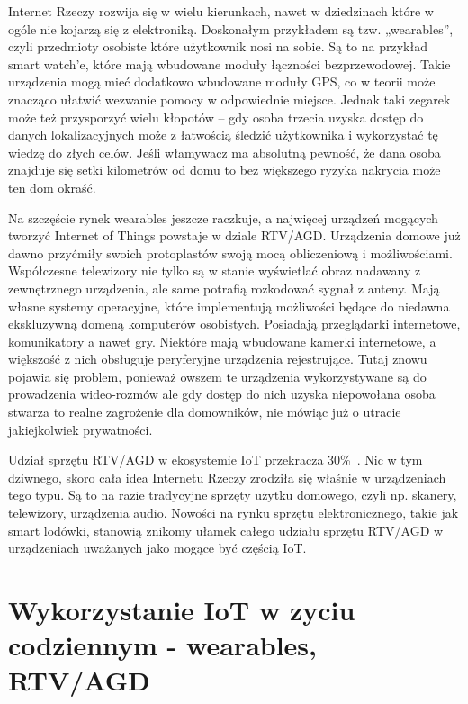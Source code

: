 \documentclass[brudnopis]{xmgr}
\begin{document}
Internet Rzeczy rozwija się w wielu kierunkach, nawet w dziedzinach które w ogóle nie kojarzą się z elektroniką. Doskonałym przykładem są tzw. „wearables”, czyli przedmioty osobiste które użytkownik nosi na sobie. Są to na przykład smart watch'e, które mają wbudowane moduły łączności bezprzewodowej.  Takie urządzenia mogą mieć dodatkowo wbudowane moduły GPS, co w teorii może znacząco ułatwić wezwanie pomocy w odpowiednie miejsce. Jednak taki zegarek może też przysporzyć wielu kłopotów – gdy osoba trzecia uzyska dostęp do danych lokalizacyjnych  może z łatwością śledzić użytkownika i wykorzystać tę wiedzę do złych celów. Jeśli włamywacz ma absolutną pewność, że dana osoba znajduje się setki kilometrów od domu to bez większego ryzyka nakrycia może ten dom okraść.

Na szczęście rynek wearables jeszcze raczkuje, a najwięcej urządzeń mogących tworzyć Internet of Things powstaje w dziale RTV/AGD. Urządzenia domowe już dawno przyćmiły swoich protoplastów swoją mocą obliczeniową i możliwościami. Współczesne telewizory nie tylko są w stanie wyświetlać obraz nadawany z zewnętrznego urządzenia, ale same potrafią rozkodować sygnał z anteny. Mają własne systemy operacyjne, które implementują możliwości będące do niedawna ekskluzywną domeną komputerów osobistych. Posiadają przeglądarki internetowe, komunikatory a nawet gry. Niektóre mają wbudowane kamerki internetowe, a większość z nich obsługuje peryferyjne urządzenia rejestrujące. Tutaj znowu pojawia się problem, ponieważ owszem te urządzenia wykorzystywane są do prowadzenia wideo-rozmów ale gdy dostęp do nich uzyska niepowołana osoba stwarza to realne zagrożenie dla domowników, nie mówiąc już o utracie jakiejkolwiek prywatności.

Udział sprzętu RTV/AGD w ekosystemie IoT przekracza 30\%~\cite{IotWPolsce:2015:CMC}. Nic w tym dziwnego, skoro cała idea Internetu Rzeczy zrodziła się właśnie w urządzeniach tego typu. Są to na razie tradycyjne sprzęty użytku domowego, czyli np. skanery, telewizory, urządzenia audio. Nowości na rynku sprzętu elektronicznego, takie jak smart lodówki, stanowią znikomy ułamek całego udziału sprzętu RTV/AGD w urządzeniach uważanych jako mogące być częścią IoT.

\section{Wykorzystanie IoT w zyciu codziennym - wearables, RTV/AGD}
\end{document}
